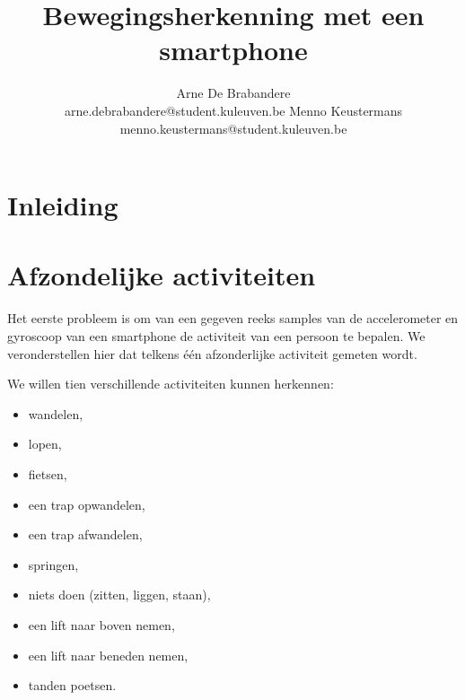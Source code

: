 \documentclass{article}
\title{Bewegingsherkenning met een smartphone}
\author{Arne De Brabandere\\
	arne.debrabandere@student.kuleuven.be
    \And
    Menno Keustermans\\
    menno.keustermans@student.kuleuven.be}
\begin{document}
\maketitle

\begin{abstract}


\end{abstract}

\section{Inleiding}





\section{Afzondelijke activiteiten}

Het eerste probleem is om van een gegeven reeks samples van de accelerometer en gyroscoop van een smartphone de activiteit van een persoon te bepalen. We veronderstellen hier dat telkens \'e\'en afzonderlijke activiteit gemeten wordt.

We willen tien verschillende activiteiten kunnen herkennen:
\begin{itemize}
\item wandelen,
\item lopen,
\item fietsen,
\item een trap opwandelen,
\item een trap afwandelen,
\item springen,
\item niets doen (zitten, liggen, staan),
\item een lift naar boven nemen, %
\item een lift naar beneden nemen,
\item tanden poetsen.
\end{itemize}
\end{document}
